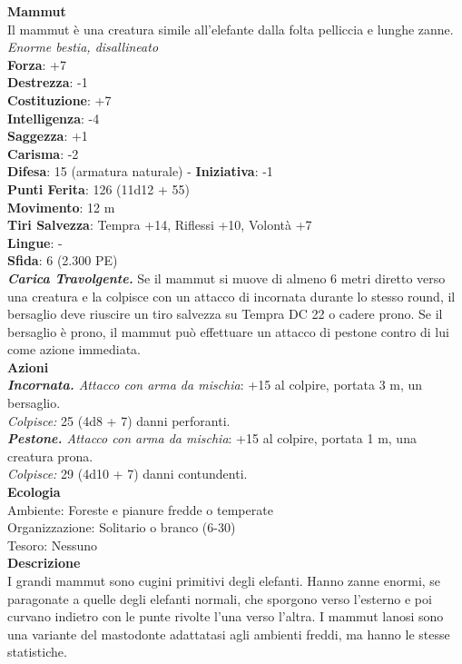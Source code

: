 \begin{multicols}{2}
\medskip\textbf{Mammut}\\
Il mammut è una creatura simile all'elefante dalla folta pelliccia e lunghe zanne.\\
\emph{Enorme bestia, disallineato}\\
\textbf{Forza}: +7\\
\textbf{Destrezza}: -1\\
\textbf{Costituzione}: +7\\
\textbf{Intelligenza}: -4\\
\textbf{Saggezza}: +1\\
\textbf{Carisma}: -2\\
\textbf{Difesa}: 15 (armatura naturale) - \textbf{Iniziativa}: -1\\
\textbf{Punti Ferita}: 126 (11d12 + 55)\\
\textbf{Movimento}: 12 m\\
\textbf{Tiri Salvezza}: Tempra +14, Riflessi +10, Volontà +7 \\
\textbf{Lingue}: -\\
\textbf{Sfida}: 6 (2.300 PE)\smallskip\\
\emph{\textbf{Carica Travolgente.}} Se il mammut si muove di almeno 6 metri diretto verso una creatura e la colpisce con un attacco di incornata durante lo stesso round, il bersaglio deve riuscire un tiro salvezza su Tempra DC  22 o cadere prono. Se il bersaglio è prono, il mammut può effettuare un attacco di pestone contro di lui come azione immediata.\\
\smallskip\textbf{Azioni}\\
\emph{\textbf{Incornata.} Attacco con arma da mischia}: +15 al colpire, portata 3 m, un bersaglio.\\
\emph{Colpisce:} 25 (4d8 + 7) danni perforanti.\\
\emph{\textbf{Pestone.} Attacco con arma da mischia}: +15 al colpire, portata 1 m, una creatura prona.\\
\emph{Colpisce:} 29 (4d10 + 7) danni contundenti.\\
\textbf{Ecologia}\\
Ambiente: Foreste e pianure fredde o temperate\\
Organizzazione: Solitario o branco (6-30)\\
Tesoro: Nessuno\\
\textbf{Descrizione}\\

I grandi mammut sono cugini primitivi degli elefanti. Hanno zanne enormi, se paragonate a quelle degli elefanti normali, che sporgono verso l'esterno e poi curvano indietro con le punte rivolte l'una verso l'altra. I mammut lanosi sono una variante del mastodonte adattatasi agli ambienti freddi, ma hanno le stesse statistiche. \\


\end{multicols}
